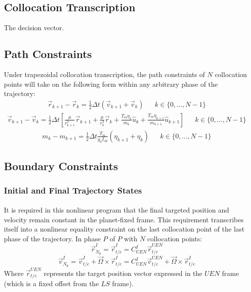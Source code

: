 \subsection{Collocation Transcription}
The decision vector.
\subsection{Path Constraints}
Under trapezoidal collocation transcription, the path constraints of $N$ collocation points will take on the following form within any arbitrary phase of the trajectory:
\begin{align}
\vec{r}_{k+1} - \vec{r}_k = \frac{1}{2}\Delta t ( \vec{v}_{k+1} + \vec{v}_k ) &&
k \in \{ 0, ... , N-1 \}
\end{align}
\begin{align}
\vec{v}_{k+1} - \vec{v}_k = \frac{1}{2}\Delta t \left[ \frac{\mu }{r_{k+1}^3}\vec{r}_{k+1} + \frac{\mu }{r_{k}^3}\vec{r}_{k} +  \frac{T_m \eta_k}{m_k} \hat{u}_{k} + \frac{T_m \eta_{k+1}}{m_{k+1}} \hat{u}_{k+1} \right] &&
k \in \{ 0, ... , N-1 \}
\end{align}
\begin{align}
m_{k} - m_{k+1} = \frac{1}{2}\Delta t \frac{T_m}{g_0 I_{sp}} ( \eta_{k+1} + \eta_{k} ) &&
k \in \{ 0, ... , N-1 \}
\end{align}
\subsection{Boundary Constraints}
\subsubsection{Initial and Final Trajectory States}
\paragraph{}
It is required in this nonlinear program that the final targeted position and velocity remain constant in the planet-fixed frame. This requirement transcribes itself into a nonlinear equality constraint on the last collocation point of the last phase of the trajectory. In phase $P$ of $P$ with $N$ collocation points:
\begin{equation}
\vec{r}_{N_{p}}^{I} = \vec{r}_{t/c}^{I} = C_{\mathit{UEN}}^{I} \vec{r}_{t/c}^{\mathit{UEN}}
\end{equation}
\begin{equation}
\vec{v}_{N_{p}}^{I} = \vec{v}_{t/c}^{I} + \vec{\Omega} \times \vec{r}_{t/c}^{I} = C_{\mathit{UEN}}^{I} \vec{v}_{t/c}^{\mathit{UEN}} + \vec{\Omega} \times \vec{r}_{t/c}^{I}
\end{equation}
Where  $\vec{r}_{t/c}^{\mathit{UEN}}$ represents the target position vector expressed in the $\mathit{UEN}$ frame (which is a fixed offset from the $\mathit{LS}$ frame).
